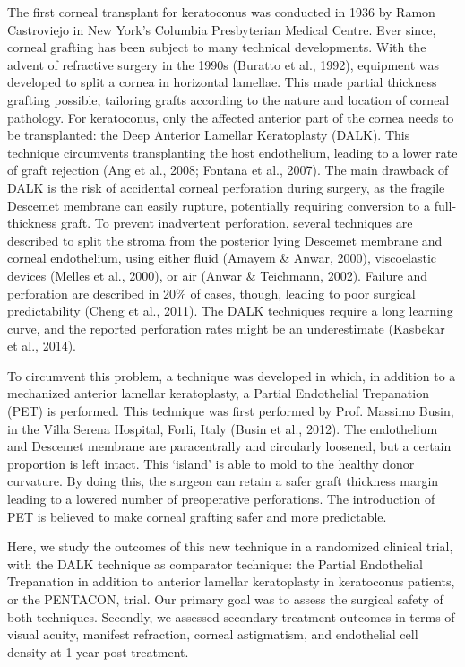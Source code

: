 \documentclass[authordate, empirical,issue]{jote-new-article}
\begin{document}
	The first corneal transplant for keratoconus was conducted in 1936 by Ramon Castroviejo in New York's Columbia Presbyterian Medical Centre. Ever since, corneal grafting has been subject to many technical developments. With the advent of refractive surgery in the 1990s (Buratto et al., 1992), equipment was developed to split a cornea in horizontal lamellae. This made partial thickness grafting possible, tailoring grafts according to the nature and location of corneal pathology. For keratoconus, only the affected anterior part of the cornea needs to be transplanted: the Deep Anterior Lamellar Keratoplasty (DALK). This technique circumvents transplanting the host endothelium, leading to a lower rate of graft rejection (Ang et al., 2008; Fontana et al., 2007). The main drawback of DALK is the risk of accidental corneal perforation during surgery, as the fragile Descemet membrane can easily rupture, potentially requiring conversion to a full-thickness graft. To prevent inadvertent perforation, several techniques are described to split the stroma from the posterior lying Descemet membrane and corneal endothelium, using either fluid (Amayem \& Anwar, 2000), viscoelastic devices (Melles et al., 2000), or air (Anwar \& Teichmann, 2002). Failure and perforation are described in 20\% of cases, though, leading to poor surgical predictability (Cheng et al., 2011). The DALK techniques require a long learning curve, and the reported perforation rates might be an underestimate (Kasbekar et al., 2014).



	To circumvent this problem, a technique was developed in which, in addition to a mechanized anterior lamellar keratoplasty, a Partial Endothelial Trepanation (PET) is performed. This technique was first performed by Prof. Massimo Busin, in the Villa Serena Hospital, Forli, Italy (Busin et al., 2012).\textsuperscript{ }The endothelium and Descemet membrane are paracentrally and circularly loosened, but a certain proportion is left intact. This ‘island' is able to mold to the healthy donor curvature. By doing this, the surgeon can retain a safer graft thickness margin leading to a lowered number of preoperative perforations. The introduction of PET is believed to make corneal grafting safer and more predictable.



	Here, we study the outcomes of this new technique in a randomized clinical trial, with the DALK technique as comparator technique: the Partial Endothelial Trepanation in addition to anterior lamellar keratoplasty in keratoconus patients, or the PENTACON, trial. Our primary goal was to assess the surgical safety of both techniques. Secondly, we assessed secondary treatment outcomes in terms of visual acuity, manifest refraction, corneal astigmatism, and endothelial cell density at 1 year post-treatment.
\end{document}
